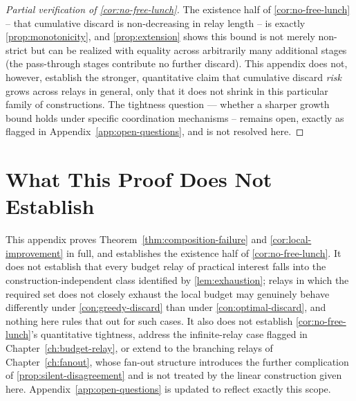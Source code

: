 \begin{proof}[Partial verification of \cref{cor:no-free-lunch}]
The existence half of \cref{cor:no-free-lunch} -- that cumulative discard
is non-decreasing in relay length -- is exactly
\cref{prop:monotonicity}, and \cref{prop:extension} shows this bound is
not merely non-strict but can be realized with equality across
arbitrarily many additional stages (the pass-through stages contribute
no further discard). This appendix does not, however, establish the
stronger, quantitative claim that cumulative discard \emph{risk} grows
across relays in general, only that it does not shrink in this
particular family of constructions. The tightness question --- whether a
sharper growth bound holds under specific coordination mechanisms --
remains open, exactly as flagged in Appendix~\ref{app:open-questions},
and is not resolved here.
\end{proof}

\section{What This Proof Does Not Establish}

This appendix proves Theorem~\ref{thm:composition-failure} and
\cref{cor:local-improvement} in full, and establishes the existence half
of \cref{cor:no-free-lunch}. It does not establish that every budget
relay of practical interest falls into the construction-independent class
identified by \cref{lem:exhaustion}; relays in which the required set
does not closely exhaust the local budget may genuinely behave
differently under \cref{con:greedy-discard} than under
\cref{con:optimal-discard}, and nothing here rules that out for such
cases. It also does not establish \cref{cor:no-free-lunch}'s quantitative
tightness, address the infinite-relay case flagged in
Chapter~\ref{ch:budget-relay}, or extend to the branching relays of
Chapter~\ref{ch:fanout}, whose fan-out structure introduces the further
complication of \cref{prop:silent-disagreement} and is not treated by the
linear construction given here. Appendix~\ref{app:open-questions} is
updated to reflect exactly this scope.
